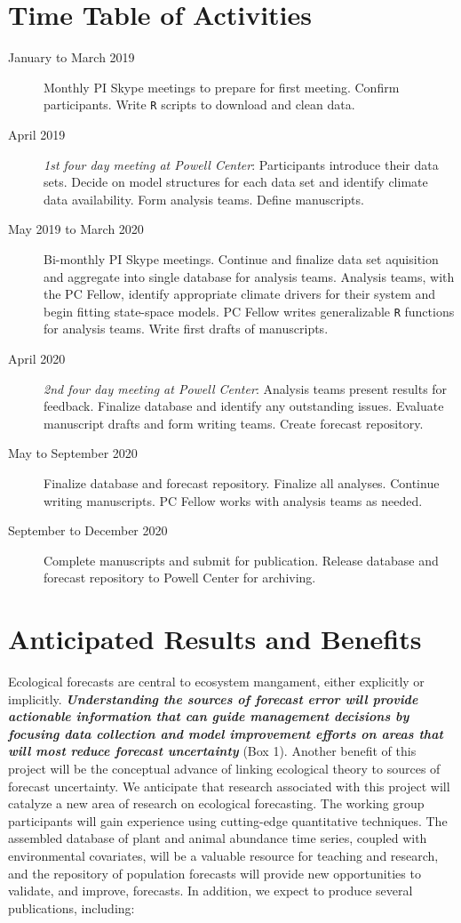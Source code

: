 \documentclass[12pt,]{article}
\begin{document}
\normalsize

\section{Time Table of Activities}\begin{description}

\item[January to March 2019] Monthly PI Skype meetings to prepare for first meeting. Confirm participants. Write \texttt{R} scripts to download and clean data.
\item[April 2019] \textit{1st four day meeting at Powell Center}: Participants introduce their data sets. Decide on model structures for each data set and identify climate data availability. Form analysis teams. Define manuscripts.
\item[May 2019 to March 2020] Bi-monthly PI Skype meetings. Continue and finalize data set aquisition and aggregate into single database for analysis teams. Analysis teams, with the PC Fellow, identify appropriate climate drivers for their system and begin fitting state-space models. PC Fellow writes generalizable \texttt{R} functions for analysis teams. Write first drafts of manuscripts.
\item[April 2020] \textit{2nd four day meeting at Powell Center}: Analysis teams present results for feedback. Finalize database and identify any outstanding issues. Evaluate manuscript drafts and form writing teams. Create forecast repository.
\item[May to September 2020] Finalize database and forecast repository. Finalize all analyses. Continue writing manuscripts. PC Fellow works with analysis teams as needed.
\item[September to December 2020] Complete manuscripts and submit for publication. Release database and forecast repository to Powell Center for archiving.

\end{description}

\section{Anticipated Results and Benefits}

Ecological forecasts are central to ecosystem mangament, either
explicitly or implicitly.
\textbf{\emph{Understanding the sources of forecast error will provide actionable information that can guide management decisions by focusing data collection and model improvement efforts on areas that will most reduce forecast uncertainty}}
(Box 1). Another benefit of this project will be the conceptual advance
of linking ecological theory to sources of forecast uncertainty. We
anticipate that research associated with this project will catalyze a
new area of research on ecological forecasting. The working group
participants will gain experience using cutting-edge quantitative
techniques. The assembled database of plant and animal abundance time
series, coupled with environmental covariates, will be a valuable
resource for teaching and research, and the repository of population
forecasts will provide new opportunities to validate, and improve,
forecasts. In addition, we expect to produce several publications,
including:
\end{document}
